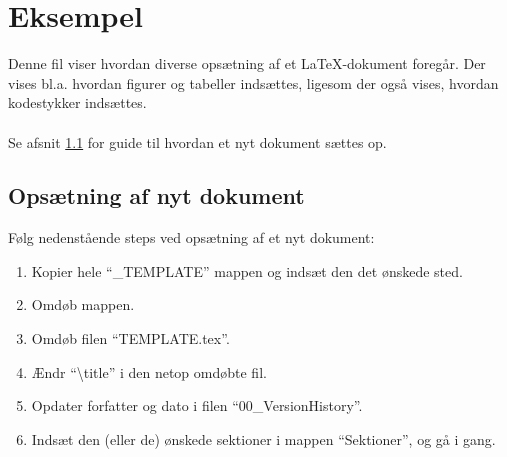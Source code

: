 \section{Eksempel}
Denne fil viser hvordan diverse opsætning af et LaTeX-dokument foregår. Der vises bl.a. hvordan figurer og tabeller indsættes, ligesom der også vises, hvordan kodestykker indsættes.\\
\smallskip\\
Se afsnit \ref{subsec:setup_new_document} for guide til hvordan et nyt dokument sættes op.

\subsection{Opsætning af nyt dokument}
\label{subsec:setup_new_document}
Følg nedenstående steps ved opsætning af et nyt dokument:
\begin{enumerate}
	\item Kopier hele ``\_TEMPLATE'' mappen og indsæt den det ønskede sted.
	\item Omdøb mappen.
	\item Omdøb filen ``TEMPLATE.tex''.
	\item Ændr ``\textbackslash title'' i den netop omdøbte fil.
	\item Opdater forfatter og dato i filen ``00\_VersionHistory''.
	\item Indsæt den (eller de) ønskede sektioner i mappen ``Sektioner'', og gå i gang.
\end{enumerate}

